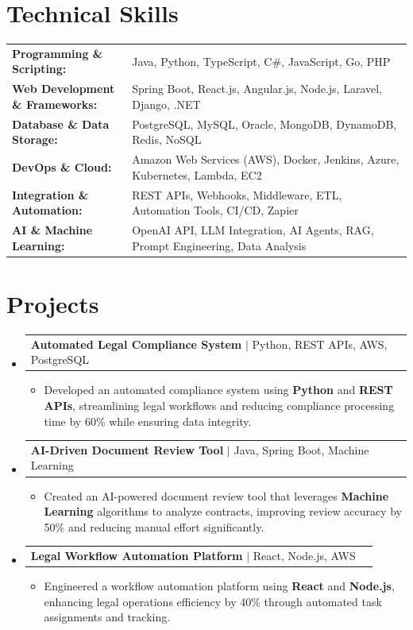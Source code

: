 \documentclass[letterpaper,10pt]{article}
\makeatletter
\newcommand{\resumeItem}[1]{
  \item{\fontsize{8pt}{9pt}\selectfont
    #1 \vspace{-3pt}
  }
}
\newcommand{\resumeProjectHeading}[2]{
    \item
    \begin{tabular*}{1.001\textwidth}{l@{\extracolsep{\fill}}r}
      \fontsize{8.5pt}{10pt}#1 & \textbf{\fontsize{8.5pt}{10pt} #2}\\
    \end{tabular*}\vspace{-7pt}
}
\newcommand{\resumeSubHeadingListStart}{\begin{itemize}[leftmargin=0pt, label={}]}
\newcommand{\resumeSubHeadingListEnd}{\end{itemize}}
\newcommand{\resumeItemListStart}{\begin{itemize}[leftmargin=*]}
\newcommand{\resumeItemListEnd}{\end{itemize}\vspace{-5pt}}
\makeatother
\begin{document}
\section{Technical Skills}
        \vspace{-14pt}
        \begin{table}[h]
            \fontsize{8pt}{9pt}\selectfont
            \begin{tabular}{p{0.3\linewidth} p{0.7\linewidth}}
                \textbf{Programming \& Scripting:} & Java, Python, TypeScript, C\#, JavaScript, Go, PHP \\
                \textbf{Web Development \& Frameworks:} & Spring Boot, React.js, Angular.js, Node.js, Laravel, Django, .NET \\
                \textbf{Database \& Data Storage:} & PostgreSQL, MySQL, Oracle, MongoDB, DynamoDB, Redis, NoSQL \\
                \textbf{DevOps \& Cloud:} & Amazon Web Services (AWS), Docker, Jenkins, Azure, Kubernetes, Lambda, EC2 \\
                \textbf{Integration \& Automation:} & REST APIs, Webhooks, Middleware, ETL, Automation Tools, CI/CD, Zapier \\
                \textbf{AI \& Machine Learning:} & OpenAI API, LLM Integration, AI Agents, RAG, Prompt Engineering, Data Analysis \\
            \end{tabular}
        \end{table}
 \vspace{-18pt}

\section{Projects}
    \vspace{-5pt}
    \resumeSubHeadingListStart
          \resumeProjectHeading
            {\textbf{Automated Legal Compliance System} $|$ Python, REST APIs, AWS, PostgreSQL}{}
            \resumeItemListStart
                \resumeItem{Developed an automated compliance system using \textbf{Python} and \textbf{REST APIs}, streamlining legal workflows and reducing compliance processing time by 60\% while ensuring data integrity.}
            \resumeItemListEnd
        \vspace{-12pt}
    
        \resumeProjectHeading
            {\textbf{AI-Driven Document Review Tool} $|$ Java, Spring Boot, Machine Learning}{}
        \resumeItemListStart
                \resumeItem{Created an AI-powered document review tool that leverages \textbf{Machine Learning} algorithms to analyze contracts, improving review accuracy by 50\% and reducing manual effort significantly.}
        \resumeItemListEnd
      \vspace{-12pt}
      \resumeProjectHeading
        {\textbf{Legal Workflow Automation Platform} $|$ React, Node.js, AWS}{}
    \resumeItemListStart
            \resumeItem{Engineered a workflow automation platform using \textbf{React} and \textbf{Node.js}, enhancing legal operations efficiency by 40\% through automated task assignments and tracking.}
    \resumeItemListEnd
    \resumeSubHeadingListEnd
\end{document}
